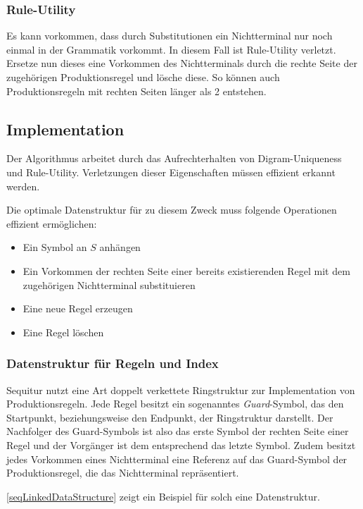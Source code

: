 \subsubsection{Rule-Utility}

Es kann vorkommen, dass durch Substitutionen ein Nichtterminal nur noch einmal in der Grammatik vorkommt. In diesem Fall ist Rule-Utility verletzt. Ersetze nun dieses eine Vorkommen des Nichtterminals durch die rechte Seite der zugehörigen Produktionsregel und lösche diese. So können auch Produktionsregeln mit rechten Seiten länger als 2 entstehen.

\subsection{Implementation}

Der Algorithmus arbeitet durch das Aufrechterhalten von Digram-Uniqueness und Rule-Utility. Verletzungen dieser Eigenschaften müssen effizient erkannt werden.

Die optimale Datenstruktur für zu diesem Zweck muss folgende Operationen effizient ermöglichen:

\begin{itemize}
	\item Ein Symbol an $S$ anhängen
	\item Ein Vorkommen der rechten Seite einer bereits existierenden Regel mit dem zugehörigen Nichtterminal substituieren
	\item Eine neue Regel erzeugen
	\item Eine Regel löschen
\end{itemize}

\subsubsection{Datenstruktur für Regeln und Index}

Sequitur nutzt eine Art doppelt verkettete Ringstruktur zur Implementation von Produktionsregeln. 
Jede Regel besitzt ein sogenanntes \emph{Guard}-Symbol, das den Startpunkt, beziehungsweise den Endpunkt, der Ringstruktur darstellt. Der Nachfolger des Guard-Symbols ist also das erste Symbol der rechten Seite einer Regel und der Vorgänger ist dem entsprechend das letzte Symbol.
Zudem besitzt jedes Vorkommen eines Nichtterminal eine Referenz auf das Guard-Symbol der Produktionsregel, die das Nichtterminal repräsentiert. 

\autoref{seqLinkedDataStructure} zeigt ein Beispiel für solch eine Datenstruktur.


